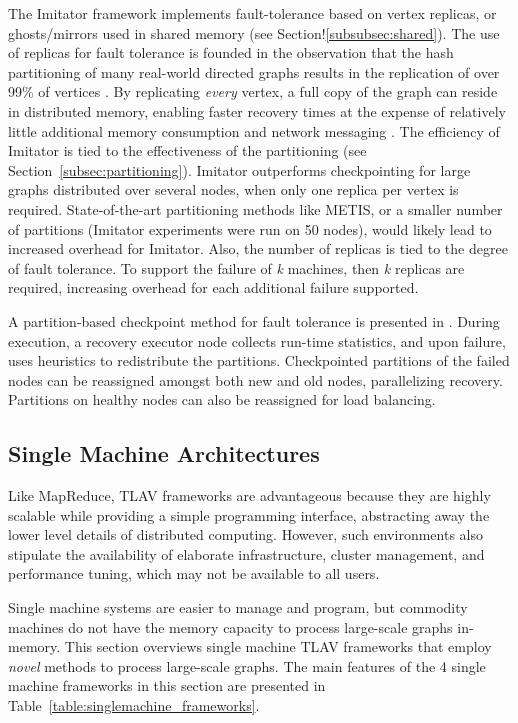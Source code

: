 \documentclass[reprint,twocolumn,showpacs,preprintnumbers,amsmath, aps,pre,amssymb]{revtex4-1}
\begin{document}
The Imitator \cite{wang-replication} framework implements fault-tolerance based on vertex replicas, or ghosts/mirrors used in shared memory (see Section!\ref{subsubsec:shared}).  The use of replicas for fault tolerance is founded in the observation that the hash partitioning of many real-world directed graphs results in the replication of over 99\% of vertices \cite{wang-replication}.  By replicating \textit{every} vertex, a full copy of the graph can reside in distributed memory, enabling faster recovery times at the expense of relatively little additional memory consumption and network messaging  \cite{wang-replication}.  The efficiency of Imitator is tied to the effectiveness of the partitioning (see Section~\ref{subsec:partitioning}).  Imitator outperforms checkpointing for large graphs distributed over several nodes, when only one replica per vertex is required.  State-of-the-art partitioning methods like METIS, or a smaller number of partitions (Imitator experiments were run on 50 nodes), would likely lead to increased overhead for Imitator.  Also, the number of replicas is tied to the degree of fault tolerance.  To support the failure of {\em k} machines, then {\em k} replicas are required, increasing overhead for each additional failure supported.

A partition-based checkpoint method for fault tolerance is presented in \cite{shen-partitionbased}.  During execution, a recovery executor node collects run-time statistics, and upon failure, uses heuristics to redistribute the partitions.  Checkpointed partitions of the failed nodes can be reassigned amongst both new and old nodes, parallelizing recovery.  Partitions on healthy nodes can also be reassigned for load balancing. 

\subsection{Single Machine Architectures}
\label{sec:arch}

Like MapReduce, TLAV frameworks are advantageous because they are highly scalable while providing a simple programming interface, abstracting away the lower level details of distributed computing.  However, such environments also stipulate the availability of elaborate infrastructure, cluster management, and performance tuning, which may not be available to all users.

Single machine systems are easier to manage and program, but commodity machines do not have the memory capacity to process large-scale graphs in-memory.  This section overviews single machine TLAV frameworks that employ {\em novel} methods to process large-scale graphs.  The main features of the 4 single machine frameworks in this section are presented in Table~\ref{table:singlemachine_frameworks}.
\end{document}
